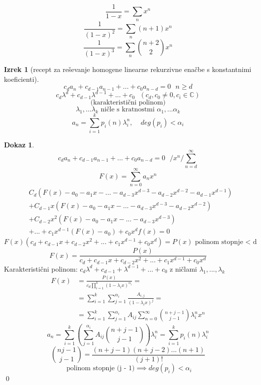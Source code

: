 \documentclass[a4paper,12pt]{article}
\theoremstyle{definition}
\newtheorem{theorem}[counter]{Izrek}
\newtheorem{pro}[counter]{Dokaz}
\theoremstyle{remark}
\newcommand{\C}{\mathbb{C}}
\begin{document}
\[\frac{1}{1 - x} = \sum_n x^n\]
\[\frac{1}{(1 - x)^2} = \sum_n (n + 1)x^n\]
\[\frac{1}{(1 - x)^3} = \sum_n \binom{n + 2}{2} x^n\]


\begin{theorem}[recept za reševanje homogene linearne rekurzivne enačbe s konstantnimi koeficienti]
    \[c_d a_n + c_{d - 1} a_{n - 1} + ... + c_0 a_{n - d} = 0 \ \ \ n \geqslant d\]
    \[c_d \lambda^d + c_{d - 1} \lambda^{d - 1} + ... + c_0 \ \ \ (c_d, c_0 \neq 0, c_i \in \C)\]
    \[\text{(karakteristični polinom)}\]
    \[\lambda_1,... \lambda_k \text{ ničle s kratnostmi } \alpha_1, ... \alpha_k\]
    \[a_n = \sum_{i = 1}^k p_i (n) \lambda_i^n, \ \ \ \ \ deg (p_i) < \alpha_i\]
\end{theorem}

\begin{pro}
    \[c_d a_n + c_{d - 1} a_{n - 1} + ... + c_0 a_{n - d} = 0 \ \ \ / x^n / \sum_{n = d}^{\infty}\]
    \[F(x) = \sum_{n = 0}^{\infty} a_n x^n\]
    \begin{align*}
        & C_d(F(x) - a_0 - a_1x - ... - a_{d - 3}x^{d - 3} - a_{d - 2}x^{d - 2} - a_{d - 1}x^{d - 1})\\
        & + C_{d - 1} x (F(x) - a_0 - a_1x - ... - a_{d - 3}x^{d - 3} - a_{d - 2}x^{d - 2})\\
        & + C_{d - 2} x^2 (F(x) - a_0 - a_1x - ... - a_{d - 3}x^{d - 3})\\
        & + ... + c_1 x^{d - 1} (F(x) - a_0) + c_0 x^d f(x) = 0
    \end{align*}
    \[F(x) (c_d + c_{d - 1} x + c_{d - 2} x^2 + ... + c_1 x^{d - 1} + c_0 x^d) = P(x) \text{ polinom stopnje < d}\]
    \[F(x) = \frac{P(x)}{c_d + c_{d - 1} x + c_{d - 2} x^2 + ... + c_1 x^{d - 1} + c_0 x^d}\]
    Karakteristični polinom: $c_d \lambda^d + c_{d - 1} + \lambda^{d - 1} + ... + c_0$ z ničlami $\lambda_1, ..., \lambda_k$
    \begin{align*}
        F(x) & = \frac{P(x)}{c_d \prod_{i = 1}^k (1 - \lambda_i x)^{\alpha_i}} = \\
        & = \sum_{i = 1}^k \sum_{j = 1}^{\alpha_i} \frac{A_{i, j}}{(1 - \lambda_i x)^j} = \\
        & = \sum_{i = 1}^k \sum_{j = 1}^{\alpha_i} A_{i j} \sum_{n = 0}^{\infty} \binom{n + j - 1}{j - 1} \lambda_i^n x^n
    \end{align*}
    \[a_n = \sum_{i = 1}^k (\sum_{j = 1}^{\alpha_i} A_{i j} \binom{n + j - 1}{j - 1})\lambda_i^n = \sum_{i = 1}^k p_i(n)\lambda_i^n\]
    \[\binom{n  j - 1}{j - 1} = \frac{(n + j - 1)(n + j - 2) ... (n + 1)}{(j + 1)!}\]
    \[\text{ polinom stopnje (j - 1)} \implies deg(p_i) < \alpha_i\]
    \qed
\end{pro}
\end{document}
